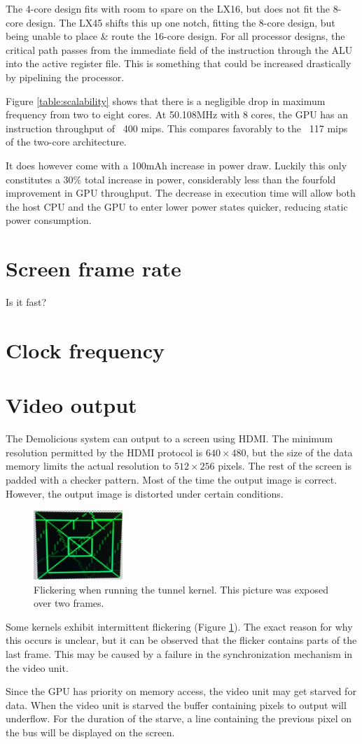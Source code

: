 \documentclass[../main/report.tex]{subfiles}
\begin{document}
The 4-core design fits with room to spare on the LX16, but does not fit the 8-core design.
The LX45 shifts this up one notch, fitting the 8-core design, but being unable to place \& route the 16-core design.
For all processor designs, the critical path passes from the immediate field of the instruction through the ALU into the active register file.
This is something that could be increased drastically by pipelining the processor.

Figure \ref{table:scalability} shows that there is a negligible drop in maximum frequency from two to eight cores.
At 50.108MHz with 8 cores, the GPU has an instruction throughput of ~400 mips.
This compares favorably to the ~117 mips of the two-core architecture.

It does however come with a 100mAh increase in power draw.
Luckily this only constitutes a 30\% total increase in power, considerably less than the fourfold improvement in GPU throughput.
The decrease in execution time will allow both the host CPU and the GPU to enter lower power states quicker, reducing static power consumption.

\section{Screen frame rate}
Is it fast?

\section{Clock frequency}

\section{Video output}
The Demolicious system can output to a screen using HDMI.
The minimum resolution permitted by the HDMI protocol is $640\times480$,
but the size of the data memory limits the actual resolution to $512\times256$ pixels.
The rest of the screen is padded with a checker pattern.
Most of the time the output image is correct.
However, the output image is distorted under certain conditions.
\begin{figure}[H]
	\centering
	\includegraphics[width=0.3\textwidth]{diagrams/flicker.jpg}
	\caption{Flickering when running the tunnel kernel. This picture was exposed over two frames.}
	\label{fig:flickering}
\end{figure}
Some kernels exhibit intermittent flickering (Figure \ref{fig:flickering}).
The exact reason for why this occurs is unclear, but
it can be observed that the flicker contains parts of the last frame. 
This may be caused by a failure in the synchronization mechanism in the video unit.

Since the GPU has priority on memory access, the video unit may get starved for data.
When the video unit is starved the buffer containing pixels to output will underflow.
For the duration of the starve, a line containing the previous pixel on the bus will be displayed on the screen.



 
\end{document}
